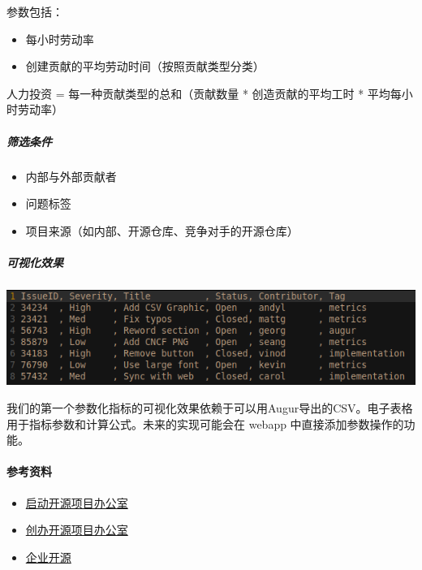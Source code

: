 参数包括：

\begin{itemize}
\tightlist
\item
  每小时劳动率
\item
  创建贡献的平均劳动时间（按照贡献类型分类）
\end{itemize}

人力投资 = 每一种贡献类型的总和（贡献数量 * 创造贡献的平均工时 *
平均每小时劳动率）

\hypertarget{ux7b5bux9009ux6761ux4ef6}{%
\subparagraph{筛选条件}\label{ux7b5bux9009ux6761ux4ef6}}

\begin{itemize}
\tightlist
\item
  内部与外部贡献者
\item
  问题标签
\item
  项目来源（如内部、开源仓库、竞争对手的开源仓库）
\end{itemize}

\hypertarget{ux53efux89c6ux5316ux6548ux679c}{%
\subparagraph{可视化效果}\label{ux53efux89c6ux5316ux6548ux679c}}

\includegraphics{images/labor-investment_csv.png}

我们的第一个参数化指标的可视化效果依赖于可以用Augur导出的CSV。电子表格用于指标参数和计算公式。未来的实现可能会在
webapp 中直接添加参数操作的功能。

\hypertarget{ux53c2ux8003ux8d44ux6599}{%
\paragraph{参考资料}\label{ux53c2ux8003ux8d44ux6599}}

\begin{itemize}
\tightlist
\item
  \href{https://www.slideshare.net/caniszczyk/starting-an-open-source-program-office-ospo}{启动开源项目办公室}
\item
  \href{https://events19.linuxfoundation.org/wp-content/uploads/2018/07/OSLS_2019-untold-story-of-OSPO.pdf}{创办开源项目办公室}
\item
  \href{https://d1.awsstatic.com/Open\%20Source/enterprise-oss-book.pdf}{企业开源}
\end{itemize}
